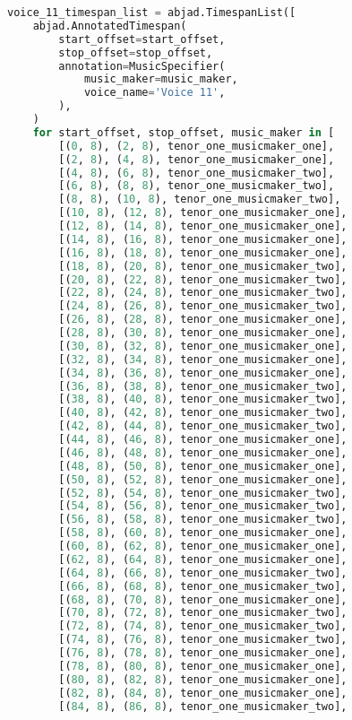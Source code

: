 \begin{lstlisting}[language=Python, caption=Invocation Source Code]
voice_11_timespan_list = abjad.TimespanList([
    abjad.AnnotatedTimespan(
        start_offset=start_offset,
        stop_offset=stop_offset,
        annotation=MusicSpecifier(
            music_maker=music_maker,
            voice_name='Voice 11',
        ),
    )
    for start_offset, stop_offset, music_maker in [
        [(0, 8), (2, 8), tenor_one_musicmaker_one],
        [(2, 8), (4, 8), tenor_one_musicmaker_one],
        [(4, 8), (6, 8), tenor_one_musicmaker_two],
        [(6, 8), (8, 8), tenor_one_musicmaker_two],
        [(8, 8), (10, 8), tenor_one_musicmaker_two],
        [(10, 8), (12, 8), tenor_one_musicmaker_one],
        [(12, 8), (14, 8), tenor_one_musicmaker_one],
        [(14, 8), (16, 8), tenor_one_musicmaker_one],
        [(16, 8), (18, 8), tenor_one_musicmaker_one],
        [(18, 8), (20, 8), tenor_one_musicmaker_two],
        [(20, 8), (22, 8), tenor_one_musicmaker_two],
        [(22, 8), (24, 8), tenor_one_musicmaker_two],
        [(24, 8), (26, 8), tenor_one_musicmaker_two],
        [(26, 8), (28, 8), tenor_one_musicmaker_one],
        [(28, 8), (30, 8), tenor_one_musicmaker_one],
        [(30, 8), (32, 8), tenor_one_musicmaker_one],
        [(32, 8), (34, 8), tenor_one_musicmaker_one],
        [(34, 8), (36, 8), tenor_one_musicmaker_one],
        [(36, 8), (38, 8), tenor_one_musicmaker_two],
        [(38, 8), (40, 8), tenor_one_musicmaker_two],
        [(40, 8), (42, 8), tenor_one_musicmaker_two],
        [(42, 8), (44, 8), tenor_one_musicmaker_two],
        [(44, 8), (46, 8), tenor_one_musicmaker_one],
        [(46, 8), (48, 8), tenor_one_musicmaker_one],
        [(48, 8), (50, 8), tenor_one_musicmaker_one],
        [(50, 8), (52, 8), tenor_one_musicmaker_one],
        [(52, 8), (54, 8), tenor_one_musicmaker_two],
        [(54, 8), (56, 8), tenor_one_musicmaker_two],
        [(56, 8), (58, 8), tenor_one_musicmaker_two],
        [(58, 8), (60, 8), tenor_one_musicmaker_one],
        [(60, 8), (62, 8), tenor_one_musicmaker_one],
        [(62, 8), (64, 8), tenor_one_musicmaker_one],
        [(64, 8), (66, 8), tenor_one_musicmaker_two],
        [(66, 8), (68, 8), tenor_one_musicmaker_two],
        [(68, 8), (70, 8), tenor_one_musicmaker_one],
        [(70, 8), (72, 8), tenor_one_musicmaker_two],
        [(72, 8), (74, 8), tenor_one_musicmaker_two],
        [(74, 8), (76, 8), tenor_one_musicmaker_two],
        [(76, 8), (78, 8), tenor_one_musicmaker_one],
        [(78, 8), (80, 8), tenor_one_musicmaker_one],
        [(80, 8), (82, 8), tenor_one_musicmaker_one],
        [(82, 8), (84, 8), tenor_one_musicmaker_one],
        [(84, 8), (86, 8), tenor_one_musicmaker_two],

\end{lstlisting}
